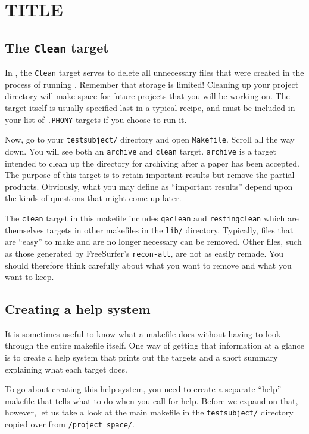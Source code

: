 \chapter{TITLE} %
\label{sec:practicum4}

\section{The \texttt{Clean} target}
In \maken{}, the \texttt{Clean} target serves to delete all unnecessary files that were created in the process of running \maken{}. Remember that storage is limited! Cleaning up your project directory will make space for future projects that you will be working on. The target itself is usually specified last in a typical \maken{} recipe, and must be included in your list of \texttt{.PHONY} targets if you choose to run it. 

Now, go to your \texttt{testsubject/} directory and open \texttt{Makefile}. Scroll all the way down. You will see both an \texttt{archive} and \texttt{clean} target. \texttt{archive} is a target intended to clean up the directory for archiving after a paper has been accepted. The purpose of this target is to retain important results but remove the partial products. Obviously, what you may define as ``important results'' depend upon the kinds of questions that might come up later. 


The \texttt{clean} target in this makefile includes \texttt{qaclean} and \texttt{restingclean} which are themselves targets in other makefiles in the \texttt{lib/} directory. Typically, files that are ``easy'' to make and are no longer necessary can be removed. Other files, such as those generated by FreeSurfer's \texttt{recon-all}, are not as easily remade. You should therefore think carefully about what you want to remove and what you want to keep.  

\section{Creating a \maken{} help system}
It is sometimes useful to know what a makefile does without having to look through the entire makefile itself. One way of getting that information at a glance is to create a \maken{} help system that prints out the targets and a short summary explaining what each target does. 

To go about creating this help system, you need to create a separate ``help'' makefile that tells \maken{} what to do when you call for help. Before we expand on that, however, let us take a look at the main makefile in the \texttt{testsubject/} directory copied over from \texttt{/project_space/}.

